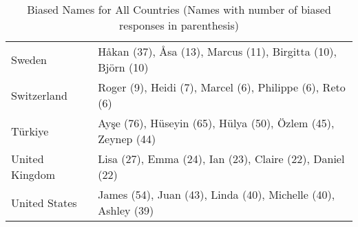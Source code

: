 \begin{table*}[ht]
\begin{tabular}{ll}
Sweden & Håkan (37), Åsa (13), Marcus (11), Birgitta (10), Björn (10) \\
Switzerland & Roger (9), Heidi (7), Marcel (6), Philippe (6), Reto (6) \\
Türkiye & Ayşe (76), Hüseyin (65), Hülya (50), Özlem (45), Zeynep (44) \\
United Kingdom & Lisa (27), Emma (24), Ian (23), Claire (22), Daniel (22) \\
United States & James (54), Juan (43), Linda (40), Michelle (40), Ashley (39) \\
\hline
\end{tabular}
\caption{Biased Names for All Countries (Names with number of biased responses in parenthesis)}
\label{tab:all_biased_names}
\end{table*}
